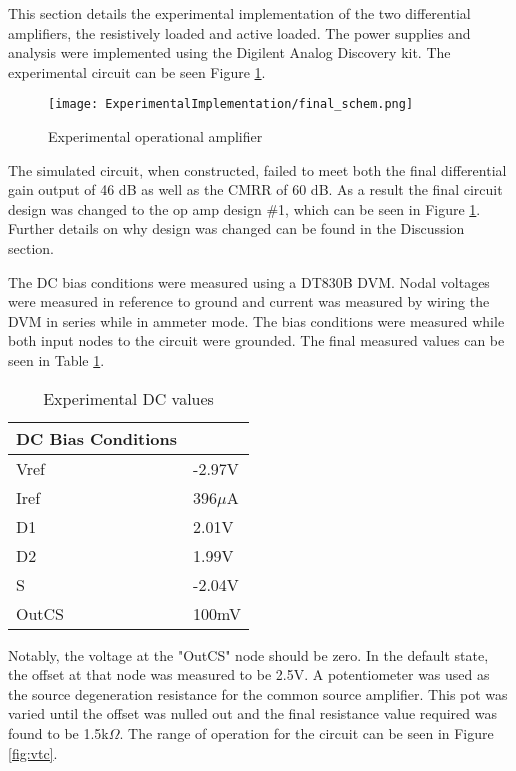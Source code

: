 




This section details the experimental implementation of the two differential amplifiers, the resistively loaded and active loaded. The power supplies and analysis were implemented using the Digilent Analog Discovery kit. The experimental circuit can be seen Figure \ref{fig:expercircuit}.

\begin{figure}[H]
	\begin{center}
		\texttt{[image: ExperimentalImplementation/final\_schem.png]}
		\caption{Experimental operational amplifier}
		\label{fig:expercircuit}
	\end{center}
\end{figure}
The simulated circuit, when constructed, failed to meet both the final differential gain output of 46 dB as well as the CMRR of 60 dB. As a result the final circuit design was changed to the op amp design \#1, which can be seen in Figure \ref{fig:expercircuit}. Further details on why design was changed can be found in the Discussion section.

The DC bias conditions were measured using a DT830B DVM. Nodal voltages were measured in reference to ground and current was measured by wiring the DVM in series while in ammeter mode. The bias conditions were measured while both input nodes to the circuit were grounded. The final measured values can be seen in Table \ref{tab:expdc}.


\begin{table}[H]
	\centering
	\caption{Experimental DC values}
	\label{tab:expdc}
	\begin{tabular}{|l|l|}
		\hline
		\textbf{DC Bias Conditions} &           \\ \hline
		Vref                        & -2.97V    \\ \hline
		Iref                        & 396$\mu$A \\ \hline
		D1                          & 2.01V     \\ \hline
		D2                          & 1.99V     \\ \hline
		S                           & -2.04V    \\ \hline
		OutCS                       & 100mV      \\ \hline
	\end{tabular}
\end{table}

Notably, the voltage at the "OutCS" node should be zero. In the default state, the offset at that node was measured to be 2.5V. A potentiometer was used as the source degeneration resistance for the common source amplifier. This pot was varied until the offset was nulled out and the final resistance value required was found to be 1.5k$\Omega$. The range of operation for the circuit can be seen in Figure \ref{fig:vtc}.


